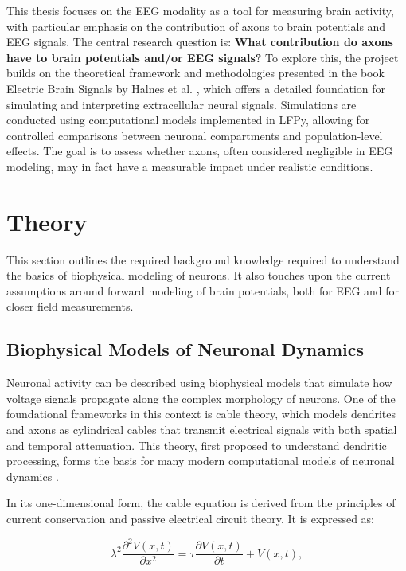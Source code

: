 \documentclass[final, a4paper,masters,en,listoffigures,listoftables,norwegiandates]{NMBU}
\begin{document}
This thesis focuses on the EEG modality as a tool for measuring brain activity, with particular emphasis on the contribution of axons to brain potentials and EEG signals. The central research question is:
\textbf{What contribution do axons have to brain potentials and/or EEG signals?}
To explore this, the project builds on the theoretical framework and methodologies presented in the book Electric Brain Signals by Halnes et al. \cite{Halnes2024ElectricBrainSignals}, which offers a detailed foundation for simulating and interpreting extracellular neural signals. Simulations are conducted using computational models implemented in LFPy, allowing for controlled comparisons between neuronal compartments and population-level effects. The goal is to assess whether axons, often considered negligible in EEG modeling, may in fact have a measurable impact under realistic conditions.

\clearpage
\section{Theory} \label{sec:theory}
This section outlines the required background knowledge required to understand the basics of biophysical modeling of neurons. It also touches upon the current assumptions around forward modeling of brain potentials, both for EEG and for closer field measurements.  
\subsection{Biophysical Models of Neuronal Dynamics} \label{subsec: biophysical models}

Neuronal activity can be described using biophysical models that simulate how voltage signals propagate along the complex morphology of neurons. One of the foundational frameworks in this context is cable theory, which models dendrites and axons as cylindrical cables that transmit electrical signals with both spatial and temporal attenuation. This theory, first proposed to understand dendritic processing, forms the basis for many modern computational models of neuronal dynamics \cite{rall1959branchingdendrites, koch1999BiophysicComputation, Halnes2024ElectricBrainSignals}.

In its one-dimensional form, the cable equation is derived from the principles of current conservation and passive electrical circuit theory. It is expressed as:

\begin{equation} \label{eq: cable equation}
\lambda^2 \frac{\partial^2 V(x,t)}{\partial x^2} = \tau \frac{\partial V(x,t)}{\partial t} + V(x,t),
\end{equation}
\end{document}
